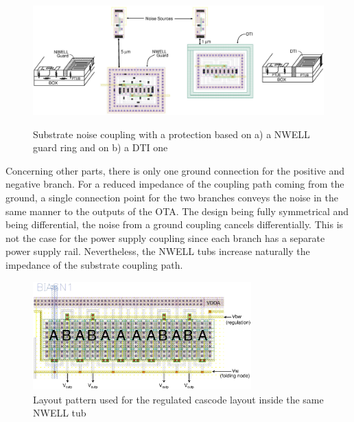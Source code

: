 \begin{figure}[htp]
    \centering
    \includegraphics[width=\textwidth]{Chapter7/Figs/layout_noise_substrate.ps}
    \begin{subfigure}[b]{0.48\textwidth}
    \end{subfigure}
    \begin{subfigure}[b]{0.48\textwidth}
    \end{subfigure}
    \caption{Substrate noise coupling with a protection based on a) a NWELL guard ring and on b) a DTI one}
    \label{fig:layout_noise_substrate_coupling}
\end{figure}

Concerning other parts, there is only one ground connection for the positive and negative branch. For a reduced impedance of the coupling path coming from the ground, a single connection point for the two branches conveys the noise in the same manner to the outputs of the OTA\@. The design being fully symmetrical and being differential, the noise from a ground coupling cancels differentially. This is not the case for the power supply coupling since each branch has a separate power supply rail. Nevertheless, the NWELL tubs increase naturally the impedance of the substrate coupling path.

\begin{figure}[htp]
    \centering
    \includegraphics[width=0.75\textwidth]{Chapter7/Figs/cascode-layout-example.ps}
    \caption{Layout pattern used for the regulated cascode layout inside the same NWELL tub}
    \label{fig:layout_cascode_exemple}
\end{figure}

